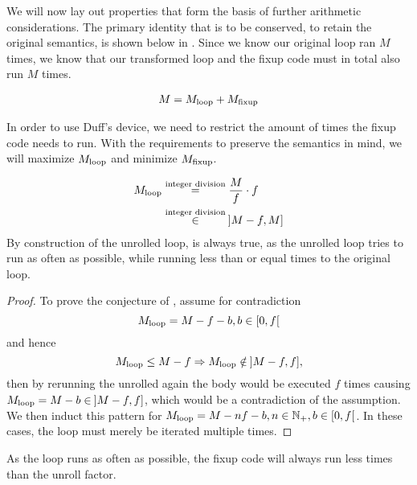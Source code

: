 We will now lay out properties that form the basis of further arithmetic considerations.
The primary identity that is to be conserved, to retain the original semantics, is shown below in .
Since we know our original loop ran $M$ times, we know that our transformed loop and the fixup code must in total also run $M$ times.

\begin{equation}\label{eqn:impl:fixup:duff:conserve-semantics-identity}
\begin{aligned}
    M = M_{\text{loop}} + M_{\text{fixup}}
\end{aligned}
\end{equation}

In order to use Duff's device, we need to restrict the amount of times the fixup code needs to run.
With the requirements to preserve the semantics in mind, we will maximize $M_{\text{loop}}$ and minimize $M_{\text{fixup}}$.

\begin{equation}\label{eqn:impl:fixup:duff:loop-iterations}
\begin{aligned}
    M_{\text{loop}} &\overset{\text{integer division}}{=} \frac{M}{f} \cdot f\\
    &\overset{\text{integer division}}{\in} \medspace \rbrack M-f,M \rbrack
\end{aligned}
\end{equation}
By construction of the unrolled loop,  is always true, as the unrolled loop tries to run as often as possible, while running less than or equal times to the original loop.
\begin{proof}\label{proof:impl:fixup:duff:loop-iterations}
To prove the conjecture of , assume for contradiction
\[M_{\text{loop}} = M - f - b,  b \in \left \lbrack 0, f \right\lbrack \]
and hence
\[M_{\text{loop}} \leq M - f \Rightarrow M_{\text{loop}} \notin \medspace \rbrack M-f,f \rbrack,\]
then by rerunning the unrolled again the body would be executed $f$ times causing $M_{\text{loop}} = M - b \in \medspace \rbrack M-f,f \rbrack$, which would be a contradiction of the assumption.
We then induct this pattern for $M_{\text{loop}} = M - nf - b, n \in \mathbb{N}_{+}, b \in \lbrack 0, f \lbrack $.
In these cases, the loop must merely be iterated multiple times.
\end{proof}

As the loop runs as often as possible, the fixup code will always run less times than the unroll factor.

